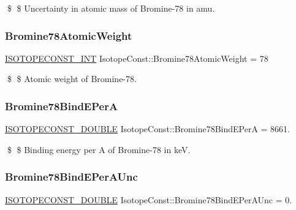 \$ \$ Uncertainty in atomic mass of Bromine-\/78 in amu. \mbox{\label{group___isotope_const-_bromine-_br78_ga6c7615ffaca96ec3e45e514c57300cc6}} 
\subsubsection{\texorpdfstring{Bromine78\+Atomic\+Weight}{Bromine78AtomicWeight}}
{\footnotesize\ttfamily \mbox{\hyperlink{group___isotope_const-_macros_ga5f18360b3e99483a35c32d789e62621c}{I\+S\+O\+T\+O\+P\+E\+C\+O\+N\+S\+T\+\_\+\+I\+NT}} Isotope\+Const\+::\+Bromine78\+Atomic\+Weight = 78}

\$ \$ Atomic weight of Bromine-\/78. \mbox{\label{group___isotope_const-_bromine-_br78_gaf0fd59933543f0bf07255128687aeab3}} 
\subsubsection{\texorpdfstring{Bromine78\+Bind\+E\+PerA}{Bromine78BindEPerA}}
{\footnotesize\ttfamily \mbox{\hyperlink{group___isotope_const-_macros_ga8f45a7272ce02c0b4c65c44636ed719a}{I\+S\+O\+T\+O\+P\+E\+C\+O\+N\+S\+T\+\_\+\+D\+O\+U\+B\+LE}} Isotope\+Const\+::\+Bromine78\+Bind\+E\+PerA = 8661.}

\$ \$ Binding energy per A of Bromine-\/78 in keV. \mbox{\label{group___isotope_const-_bromine-_br78_ga7fe8390f1fa49f57e8ccd222c92aa94f}} 
\subsubsection{\texorpdfstring{Bromine78\+Bind\+E\+Per\+A\+Unc}{Bromine78BindEPerAUnc}}
{\footnotesize\ttfamily \mbox{\hyperlink{group___isotope_const-_macros_ga8f45a7272ce02c0b4c65c44636ed719a}{I\+S\+O\+T\+O\+P\+E\+C\+O\+N\+S\+T\+\_\+\+D\+O\+U\+B\+LE}} Isotope\+Const\+::\+Bromine78\+Bind\+E\+Per\+A\+Unc = 0.}

